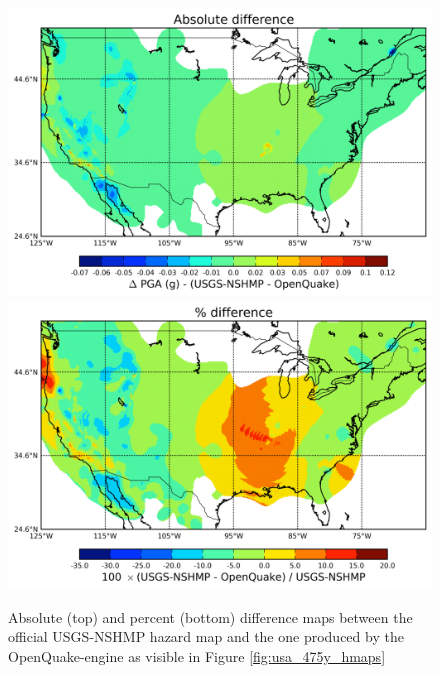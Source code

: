 \begin{figure}
\centering
\includegraphics[width=14cm]{./qareport/pictures/map_usa_PGA_0pt1_abs_diff_NSHMP_OQ.pdf}
\includegraphics[width=14cm]{./qareport/pictures/map_usa_PGA_0pt1_percent_diff_NSHMP_OQ.pdf}
\caption{Absolute (top) and percent (bottom) difference maps between the
official USGS-NSHMP hazard map and the one produced by the OpenQuake-engine as
visible in Figure \ref{fig:usa_475y_hmaps}}
\label{fig:usa_475y_dmaps}
\end{figure}
%
